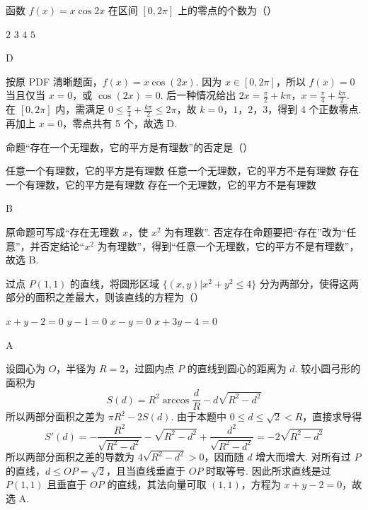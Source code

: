 \begin{problem}
函数 \( f(x) = x \cos 2x \) 在区间 \([0, 2\pi]\) 上的零点的个数为（\quad）

\choices
    {\(2\)}
    {\(3\)}
    {\(4\)}
    {\(5\)}
\end{problem}

\begin{answer}
D
\end{answer}

\begin{solution}
按原 PDF 清晰题面，\(f(x)=x\cos(2x)\). 因为 \(x\in[0,2\pi]\)，所以 \(f(x)=0\) 当且仅当 \(x=0\)，或 \(\cos(2x)=0\). 后一种情况给出
\(2x=\frac{\pi}{2}+k\pi\)，\(x=\frac{\pi}{4}+\frac{k\pi}{2}\).
在 \([0,2\pi]\) 内，需满足 \(0\leqslant \frac{\pi}{4}+\frac{k\pi}{2}\leqslant2\pi\)，故 \(k=0\)，\(1\)，\(2\)，\(3\)，得到 4 个正数零点. 再加上 \(x=0\)，零点共有 5 个，故选 D.
\end{solution}

\begin{problem}
命题“存在一个无理数，它的平方是有理数”的否定是（\quad）

\choices
    {任意一个有理数，它的平方是有理数}
    {任意一个无理数，它的平方不是有理数}
    {存在一个有理数，它的平方是有理数}
    {存在一个无理数，它的平方不是有理数}
\end{problem}

\begin{answer}
B
\end{answer}

\begin{solution}
原命题可写成“存在无理数 \(x\)，使 \(x^{2}\) 为有理数”. 否定存在命题要把“存在”改为“任意”，并否定结论“\(x^{2}\) 为有理数”，得到“任意一个无理数，它的平方不是有理数”，故选 B.
\end{solution}

\begin{problem}
过点 \(P(1,1)\) 的直线，将圆形区域 \(\{(x,y) | x^2 + y^2 \leqslant 4\}\) 分为两部分，使得这两部分的面积之差最大，则该直线的方程为（\quad）

\choices
    {\(x + y - 2 = 0\)}
    {\(y - 1 = 0\)}
    {\(x - y = 0\)}
    {\(x + 3y - 4 = 0\)}
\end{problem}

\begin{answer}
A
\end{answer}

\begin{solution}
设圆心为 \(O\)，半径为 \(R=2\)，过圆内点 \(P\) 的直线到圆心的距离为 \(d\). 较小圆弓形的面积为
\[
S(d)=R^{2}\arccos\frac dR-d\sqrt{R^{2}-d^{2}}
\]
所以两部分面积之差为 \(\pi R^{2}-2S(d)\). 由于本题中 \(0\leqslant d\leqslant\sqrt{2}<R\)，直接求导得
\[
S'(d)=-\frac{R^{2}}{\sqrt{R^{2}-d^{2}}}-\sqrt{R^{2}-d^{2}}+\frac{d^{2}}{\sqrt{R^{2}-d^{2}}}=-2\sqrt{R^{2}-d^{2}}
\]
所以两部分面积之差的导数为 \(4\sqrt{R^{2}-d^{2}}>0\)，因而随 \(d\) 增大而增大. 对所有过 \(P\) 的直线，\(d\leqslant OP=\sqrt{2}\)，且当直线垂直于 \(OP\) 时取等号. 因此所求直线是过 \(P(1,1)\) 且垂直于 \(OP\) 的直线，其法向量可取 \((1,1)\)，方程为 \(x+y-2=0\)，故选 A.
\end{solution}

